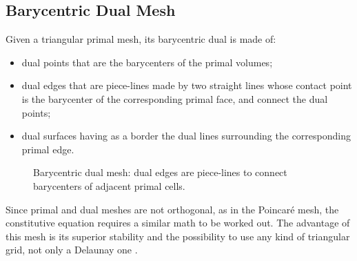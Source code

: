 \subsection{Barycentric Dual Mesh} \label{sec:barycentric}

Given a triangular primal mesh, its barycentric dual is made of:
\begin{itemize}
\item
  dual points that are the barycenters of the primal volumes;
\item
  dual edges that are piece-lines made by two straight lines whose
  contact point is the barycenter of the corresponding primal face,
  and connect the dual points;
\item
  dual surfaces having as a border the dual lines surrounding the
  corresponding primal edge.
\end{itemize}

\begin{figure}[htbp]
  \begin{center}
    \resizebox{4cm}{!}{}
  \end{center}
  \caption{Barycentric dual mesh: dual edges are piece-lines to
  connect barycenters of adjacent primal cells.}
  \label{fig:barycentric}
\end{figure}

Since primal and dual meshes are not orthogonal, as in the Poincar\'e
mesh, the constitutive equation requires a similar math to be worked
out. The advantage of this mesh is its superior stability and the
possibility to use any kind of triangular grid, not only a Delaunay
one \cite{marrone_computational}.

